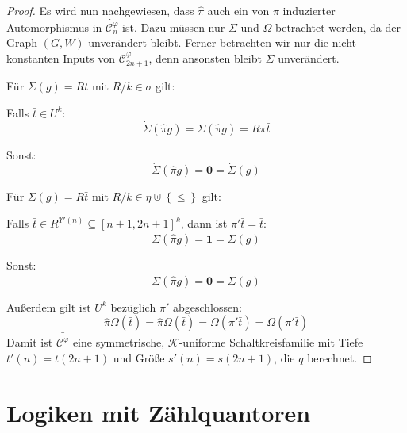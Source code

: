 \begin{proof}
Es wird nun nachgewiesen, dass $\hat{\pi}$ auch ein von $\pi$ induzierter
Automorphismus in $\dot{\mathcal{C}_{n}^{\varphi}}$ ist. Dazu müssen
nur $\dot{\Sigma}$ und $\dot{\Omega}$ betrachtet werden, da der
Graph $\left(G,W\right)$ unverändert bleibt. Ferner betrachten wir
nur die nicht-konstanten Inputs von $\mathcal{C}_{2n+1}^{\varphi}$,
denn ansonsten bleibt $\Sigma$ unverändert.

\begin{casenv}
\item Für $\Sigma\left(g\right)=R\bar{t}$ mit $R/k\in\sigma$ gilt:

\begin{casenv}
\item Falls $\bar{t}\in U^{k}$:
\[
\dot{\Sigma}\left(\hat{\pi}g\right)=\Sigma\left(\hat{\pi}g\right)=R\pi\bar{t}
\]
\item Sonst:
\[
\dot{\Sigma}\left(\hat{\pi}g\right)=\mathbf{0}=\dot{\Sigma}\left(g\right)
\]
\end{casenv}
\item Für $\Sigma\left(g\right)=R\bar{t}$ mit $R/k\in\eta\uplus\left\{ \leqslant\right\} $
gilt:

\begin{casenv}
\item Falls $\bar{t}\in R^{\Upsilon'\left(n\right)}\subseteq\left[n+1,2n+1\right]^{k}$,
dann ist $\pi'\bar{t}=\bar{t}$:
\[
\dot{\Sigma}\left(\hat{\pi}g\right)=\mathbf{1}=\dot{\Sigma}\left(g\right)
\]
\item Sonst:
\[
\dot{\Sigma}\left(\hat{\pi}g\right)=\mathbf{0}=\dot{\Sigma}\left(g\right)
\]
\end{casenv}
\end{casenv}
Außerdem gilt ist $U^{k}$ bezüglich $\pi'$ abgeschlossen: 
\[
\hat{\pi}\dot{\Omega}\left(\bar{t}\right)=\hat{\pi}\Omega\left(\bar{t}\right)=\Omega\left(\pi'\bar{t}\right)=\dot{\Omega}\left(\pi'\bar{t}\right)
\]
 Damit ist $\bar{\dot{\mathcal{C}^{\varphi}}}$ eine symmetrische,
$\mathcal{K}$-uniforme Schaltkreisfamilie mit Tiefe $t'\left(n\right)=t\left(2n+1\right)$
und Größe $s'\left(n\right)=s\left(2n+1\right)$, die $q$ berechnet.
\end{proof}

\section{Logiken mit Zählquantoren}

